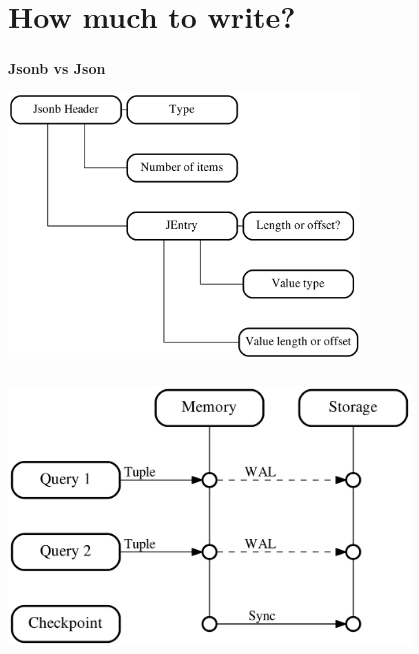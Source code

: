 \documentclass[usenames,dvipsnames, 18pt, compress, aspectratio=169]{beamer}
\begin{document}
\fontsize{13pt}{14}\selectfont
\section{How much to write?}
\fontsize{17pt}{18}\selectfont

\begin{frame}
    \frametitle{}
    \begin{center}
        \textbf{Jsonb vs Json}

        \includegraphics[width=0.7\textwidth,center]{jsonb_header.png}

    \end{center}
\end{frame}

\begin{frame}
    \frametitle{}
    \begin{center}

        \includegraphics[width=0.8\textwidth,center]{wal.png}

    \end{center}
\end{frame}
\end{document}
